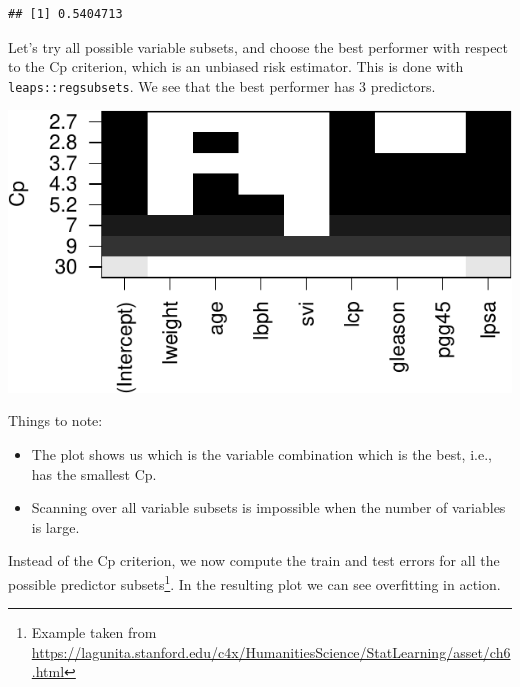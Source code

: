 \documentclass[]{book}
\newenvironment{Shaded}{\begin{snugshade}}{\end{snugshade}}
\newcommand{\CommentTok}[1]{\textcolor[rgb]{0.56,0.35,0.01}{\textit{#1}}}
\newcommand{\DataTypeTok}[1]{\textcolor[rgb]{0.13,0.29,0.53}{#1}}
\newcommand{\KeywordTok}[1]{\textcolor[rgb]{0.13,0.29,0.53}{\textbf{#1}}}
\newcommand{\NormalTok}[1]{#1}
\newcommand{\OperatorTok}[1]{\textcolor[rgb]{0.81,0.36,0.00}{\textbf{#1}}}
\newcommand{\StringTok}[1]{\textcolor[rgb]{0.31,0.60,0.02}{#1}}
\providecommand{\tightlist}{%
  \setlength{\itemsep}{0pt}\setlength{\parskip}{0pt}}
\theoremstyle{definition}
\theoremstyle{definition}
\theoremstyle{definition}
\theoremstyle{remark}
\begin{document}
\begin{verbatim}
## [1] 0.5404713
\end{verbatim}

Let's try all possible variable subsets, and choose the best performer with respect to the Cp criterion, which is an unbiased risk estimator.
This is done with \texttt{leaps::regsubsets}.
We see that the best performer has 3 predictors.

\begin{Shaded}
\end{Shaded}

\includegraphics[width=0.5\linewidth]{Rcourse_files/figure-latex/all subset-1}

Things to note:

\begin{itemize}
\tightlist
\item
  The plot shows us which is the variable combination which is the best, i.e., has the smallest Cp.
\item
  Scanning over all variable subsets is impossible when the number of variables is large.
\end{itemize}

Instead of the Cp criterion, we now compute the train and test errors for all the possible predictor subsets\footnote{Example taken from \url{https://lagunita.stanford.edu/c4x/HumanitiesScience/StatLearning/asset/ch6.html}}.
In the resulting plot we can see overfitting in action.
\end{document}
